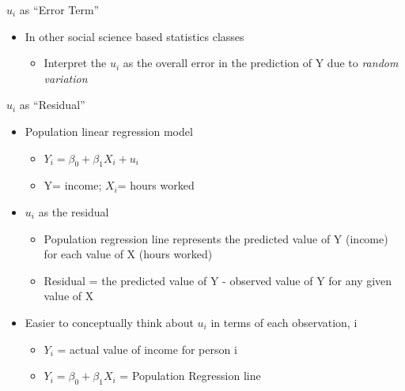 \documentclass[
  8pt,
  ignorenonframetext,
  dvipsnames]{beamer}
\providecommand{\tightlist}{%
  \setlength{\itemsep}{0pt}\setlength{\parskip}{0pt}}
\let\olditem\item
\renewcommand{\item}{%
  \olditem\vspace{4pt}
}
\begin{document}
\begin{frame}{\(u_i\) as ``Error Term''}
\medskip

\begin{itemize}
\tightlist
\item
  In other social science based statistics classes

  \begin{itemize}
  \tightlist
  \item
    Interpret the \(u_i\) as the overall error in the prediction of Y
    due to \emph{random variation}
  \end{itemize}
\end{itemize}

\end{frame}

\begin{frame}{\(u_i\) as ``Residual''}
\protect\hypertarget{u_i-as-residual}{}

\begin{itemize}
\tightlist
\item
  Population linear regression model

  \begin{itemize}
  \tightlist
  \item
    \(Y_i = \beta_0 + \beta_1X_i + u_i\)
  \item
    Y= income; \(X_i\)= hours worked
  \end{itemize}
\end{itemize}

\medskip

\begin{itemize}
\tightlist
\item
  \(u_i\) as the residual

  \begin{itemize}
  \tightlist
  \item
    Population regression line represents the predicted value of Y
    (income) for each value of X (hours worked)
  \item
    Residual = the predicted value of Y - observed value of Y for any
    given value of X
  \end{itemize}
\end{itemize}

\medskip

\begin{itemize}
\item
  Easier to conceptually think about \(u_i\) in terms of each
  observation, i

  \begin{itemize}
  \tightlist
  \item
    \(Y_i\) = actual value of income for person i
  \item
    \(Y_i = \beta_0 + \beta_1X_i\) = Population Regression line


\end{itemize}
\end{itemize}
\end{frame}
\end{document}
